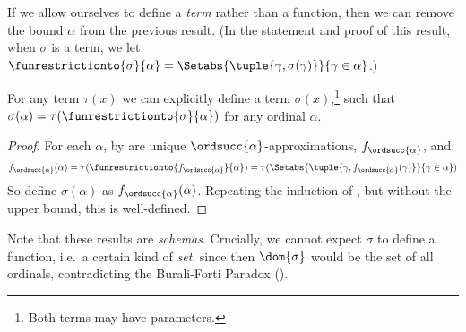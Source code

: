 \documentclass[../../../include/open-logic-section]{subfiles}
\begin{document}
If we allow ourselves to define a \emph{term} rather than a function, then we can remove the bound $\alpha$ from the previous result. (In the statement and proof of this result, when $\sigma$ is a term, we let $\funrestrictionto{\sigma}{\alpha} = \Setabs{\tuple{\gamma, \sigma(\gamma)}}{\gamma \in \alpha}$.)
\begin{thm}
	For any term $\tau(x)$ we can explicitly define a term $\sigma(x)$,\footnote{Both terms may have parameters.} such that $\sigma(\alpha) = \tau(\funrestrictionto{\sigma}{\alpha})$ for any ordinal $\alpha$. 	
\end{thm}
\begin{proof}
	For each $\alpha$, by  are unique $\ordsucc{\alpha}$-approximations, $f_{\ordsucc{\alpha}}$, and: $$f_{\ordsucc{\alpha}}(\alpha) = \tau(\funrestrictionto{f_{\ordsucc{\alpha}}}{\alpha}) = \tau(\Setabs{\tuple{\gamma, f_{\ordsucc{\alpha}}(\gamma)}}{\gamma \in \alpha})$$
	So define $\sigma(\alpha)$ as $f_{\ordsucc{\alpha}}(\alpha)$. Repeating the induction of , but without the upper bound, this is well-defined.
\end{proof}\noindent
Note that these results are \emph{schemas}. Crucially, we cannot expect $\sigma$ to define a function, i.e.\ a certain kind of \emph{set}, since then $\dom{\sigma}$ would be the set of all ordinals, contradicting the Burali-Forti Paradox ().
\end{document}
